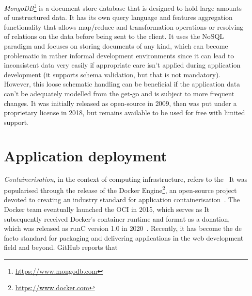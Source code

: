 \emph{MongoDB}\footnote{\url{https://www.mongodb.com}} is a document store database that is designed to hold large amounts of unstructured data.
It has its own query language and features aggregation functionality that allows map/reduce and transformation operations or resolving of relations on the data before being sent to the client.
It uses the \ac{NoSQL} paradigm and focuses on storing documents of any kind, which can become problematic in rather informal development environments since it can lead to inconsistent data very easily if appropriate care isn't applied during application development (it supports schema validation, but that is not mandatory).
However, this loose schematic handling can be beneficial if the application data can't be adequately modelled from the get-go and is subject to more frequent changes.
It was initially released as open-source in 2009, then was put under a proprietary license in 2018, but remains available to be used for free with limited support.


\section{Application deployment}
\label{sec:application-deployment}

\emph{Containerisation}, in the context of computing infrastructure, refers to the~ It was popularised through the release of the Docker Engine\footnote{\url{https://www.docker.com}}, an open-source project devoted to creating an industry standard for application containerisation~\parencite{dockerRelease}.
The Docker team eventually launched the \ac{OCI} in 2015, which serves as  It subsequently received Docker's container runtime and format as a donation, which was released as runC version 1.0 in 2020~\parencite{openContainerInitiative}.
Recently, it has become the de facto standard for packaging and delivering applications in the web development field and beyond.
GitHub reports that~

